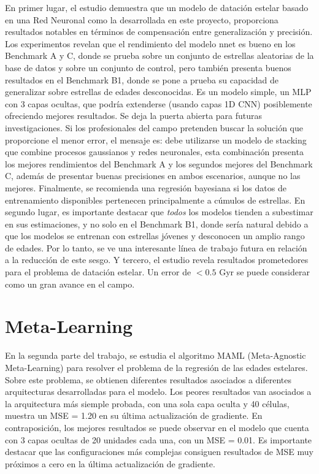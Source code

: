 En primer lugar, el estudio demuestra que un modelo de datación estelar basado en una Red Neuronal como la desarrollada en este proyecto, proporciona resultados notables en términos de compensación entre generalización y precisión. Los experimentos revelan que el rendimiento del modelo nnet es bueno en los Benchmark A y C, donde se prueba sobre un conjunto de estrellas aleatorias de la base de datos y sobre un conjunto de control, pero también presenta buenos resultados en el Benchmark B1, donde se pone a prueba su capacidad de generalizar sobre estrellas de edades desconocidas. Es un modelo simple, un MLP con 3 capas ocultas, que podría extenderse (usando capas 1D CNN) posiblemente ofreciendo mejores resultados. Se deja la puerta abierta para futuras investigaciones. Si los profesionales del campo pretenden buscar la solución que proporcione el menor error, el mensaje es: debe utilizarse un modelo de stacking que combine procesos gaussianos y redes neuronales, esta combinación presenta los mejores rendimientos del Benchmark A y los segundos mejores del Benchmark C, además de presentar buenas precisiones en ambos escenarios, aunque no las mejores. Finalmente, se recomienda una regresión bayesiana si los datos de entrenamiento disponibles pertenecen principalmente a cúmulos de estrellas.
En segundo lugar, es importante destacar que \emph{todos} los modelos tienden a subestimar en sus estimaciones, y no solo en el Benchmark B1, donde sería natural debido a que los modelos se entrenan con estrellas jóvenes y desconocen un amplio rango de edades. Por lo tanto, se ve una interesante línea de trabajo futura en relación a la reducción de este sesgo.
Y tercero, el estudio revela resultados prometedores para el problema de datación estelar. Un error de $<0.5$ Gyr se puede considerar como un gran avance en el campo.

\section{Meta-Learning}

En la segunda parte del trabajo, se estudia el algoritmo MAML (Meta-Agnostic Meta-Learning) para resolver el problema de la regresión de las edades estelares. Sobre este problema, se obtienen diferentes resultados asociados a diferentes arquitecturas desarrolladas para el modelo. Los peores resultados van asociados a la arquitectura más siemple probada, con una sola capa oculta y 40 células, muestra un MSE = 1.20 en su última actualización de gradiente. En contraposición, los mejores resultados se puede observar en el modelo que cuenta con 3 capas ocultas de 20 unidades cada una, con un MSE = 0.01. 
Es importante destacar que las configuraciones más complejas consiguen resultados de MSE muy próximos a cero en la última actualización de gradiente.

